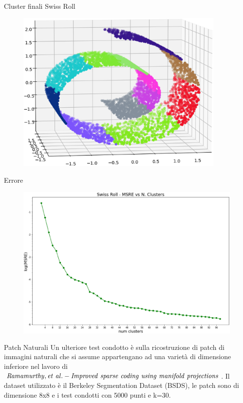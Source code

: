 \documentclass[usenames,dvipsnames,9pt]{beamer}
\theoremstyle{definition}
\begin{document}
\begin{frame}{Cluster finali Swiss Roll}
\begin{figure}[b]
\centering
\includegraphics[width=0.92\textwidth]{graphics/swissroll.eps}
\end{figure}
\end{frame}

\begin{frame}{Errore}
\begin{figure}[b]
\centering
\includegraphics[width=\textwidth]{graphics/swiss_msre.eps}
\end{figure}
\end{frame}

\begin{frame}{Patch Naturali}
Un ulteriore test condotto è sulla ricostruzione di patch di immagini naturali che si
assume appartengano ad una varietà di dimensione inferiore nel lavoro di $\it{Ramamurthy, et\ al. - Improved\ sparse\
coding\ using\ manifold\ projections}$. Il dataset utilizzato è il Berkeley Segmentation Dataset (BSDS),
le patch sono di dimensione 8x8 e i test condotti con 5000 punti e k=30.
\end{frame}
\end{document}
